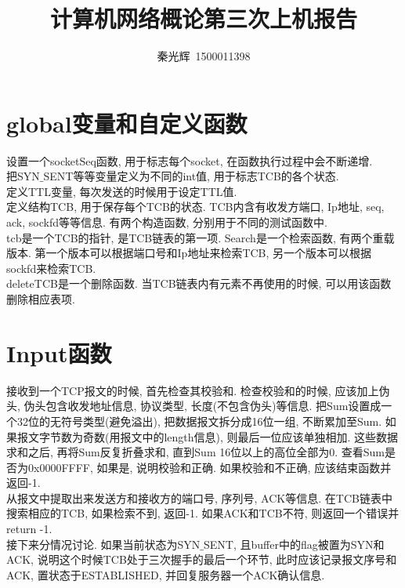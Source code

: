\documentclass[a4paper,12pt,notitlepage]{article}
\begin{document}
\title{计算机网络概论第三次上机报告}
\author{秦光辉\ 1500011398}
\maketitle

\section{global变量和自定义函数}

	设置一个socketSeq函数, 用于标志每个socket, 在函数执行过程中会不断递增. \\
	
	把SYN$\_$SENT等等变量定义为不同的int值, 用于标志TCB的各个状态. \\
	
	定义TTL变量, 每次发送的时候用于设定TTL值. \\
	
	定义结构TCB, 用于保存每个TCB的状态. TCB内含有收发方端口, Ip地址, seq, ack, sockfd等等信息. 有两个构造函数, 分别用于不同的测试函数中. \\
	
	tcb是一个TCB的指针, 是TCB链表的第一项. Search是一个检索函数, 有两个重载版本. 第一个版本可以根据端口号和Ip地址来检索TCB, 另一个版本可以根据sockfd来检索TCB. \\
	
	deleteTCB是一个删除函数. 当TCB链表内有元素不再使用的时候, 可以用该函数删除相应表项.

\section{Input函数}

	接收到一个TCP报文的时候, 首先检查其校验和. 检查校验和的时候, 应该加上伪头, 伪头包含收发地址信息, 协议类型, 长度(不包含伪头)等信息. 把Sum设置成一个32位的无符号类型(避免溢出), 把数据报文拆分成16位一组, 不断累加至Sum. 如果报文字节数为奇数(用报文中的length信息), 则最后一位应该单独相加. 这些数据求和之后, 再将Sum反复折叠求和, 直到Sum 16位以上的高位全部为0. 查看Sum是否为0x0000FFFF, 如果是, 说明校验和正确. 如果校验和不正确, 应该结束函数并返回-1. \\
	
	从报文中提取出来发送方和接收方的端口号, 序列号, ACK等信息. 在TCB链表中搜索相应的TCB, 如果检索不到, 返回-1. 如果ACK和TCB不符, 则返回一个错误并return -1. \\
	
	接下来分情况讨论. 如果当前状态为SYN$\_$SENT, 且buffer中的flag被置为SYN和ACK, 说明这个时候TCB处于三次握手的最后一个环节, 此时应该记录报文序号和ACK, 置状态于ESTABLISHED, 并回复服务器一个ACK确认信息. \\
	
\end{document}
